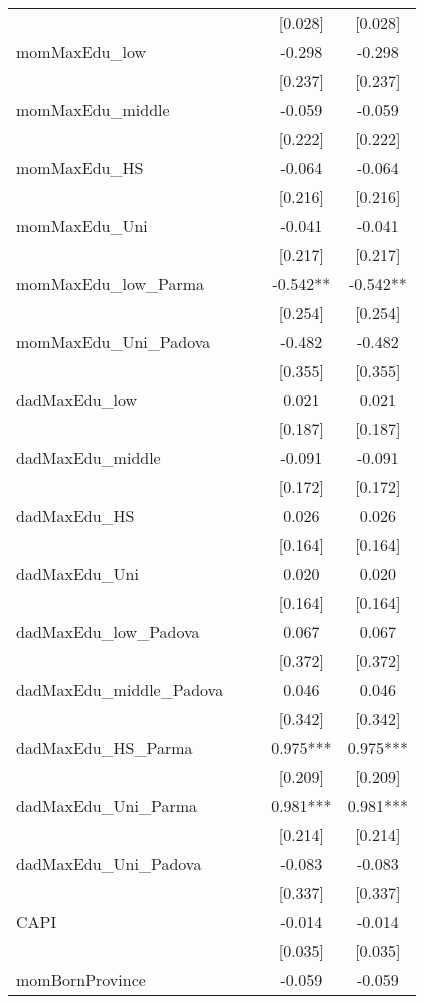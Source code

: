 \documentclass[]{article}
\begin{document}
\begin{tabular}{lcccc}
 &  &  & [0.028] & [0.028] \\
momMaxEdu\_low &  &  & -0.298 & -0.298 \\
 &  &  & [0.237] & [0.237] \\
momMaxEdu\_middle &  &  & -0.059 & -0.059 \\
 &  &  & [0.222] & [0.222] \\
momMaxEdu\_HS &  &  & -0.064 & -0.064 \\
 &  &  & [0.216] & [0.216] \\
momMaxEdu\_Uni &  &  & -0.041 & -0.041 \\
 &  &  & [0.217] & [0.217] \\
momMaxEdu\_low\_Parma &  &  & -0.542** & -0.542** \\
 &  &  & [0.254] & [0.254] \\
momMaxEdu\_Uni\_Padova &  &  & -0.482 & -0.482 \\
 &  &  & [0.355] & [0.355] \\
dadMaxEdu\_low &  &  & 0.021 & 0.021 \\
 &  &  & [0.187] & [0.187] \\
dadMaxEdu\_middle &  &  & -0.091 & -0.091 \\
 &  &  & [0.172] & [0.172] \\
dadMaxEdu\_HS &  &  & 0.026 & 0.026 \\
 &  &  & [0.164] & [0.164] \\
dadMaxEdu\_Uni &  &  & 0.020 & 0.020 \\
 &  &  & [0.164] & [0.164] \\
dadMaxEdu\_low\_Padova &  &  & 0.067 & 0.067 \\
 &  &  & [0.372] & [0.372] \\
dadMaxEdu\_middle\_Padova &  &  & 0.046 & 0.046 \\
 &  &  & [0.342] & [0.342] \\
dadMaxEdu\_HS\_Parma &  &  & 0.975*** & 0.975*** \\
 &  &  & [0.209] & [0.209] \\
dadMaxEdu\_Uni\_Parma &  &  & 0.981*** & 0.981*** \\
 &  &  & [0.214] & [0.214] \\
dadMaxEdu\_Uni\_Padova &  &  & -0.083 & -0.083 \\
 &  &  & [0.337] & [0.337] \\
CAPI &  &  & -0.014 & -0.014 \\
 &  &  & [0.035] & [0.035] \\
momBornProvince &  &  & -0.059 & -0.059 \\

\end{tabular}
\end{document}
